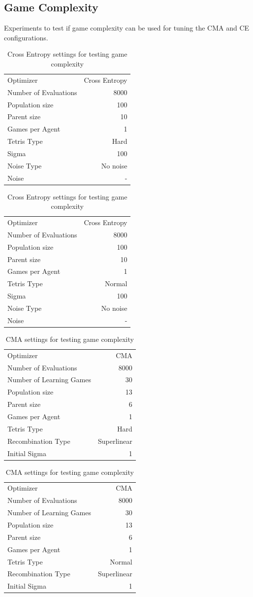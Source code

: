 \subsection{Game Complexity}
Experiments to test if game complexity can be used for tuning the CMA and CE configurations.

\begin{table}[h]
\centering
\begin{tabular}{l r}
Optimizer & Cross Entropy\\
Number of Evaluations & 8000\\
Population size & 100\\
Parent size & 10\\
Games per Agent & 1\\
Tetris Type & Hard\\
\hline
Sigma & 100\\
Noise Type & No noise\\
Noise & -
\end{tabular}
\quad
\begin{tabular}{l r}
Optimizer & Cross Entropy\\
Number of Evaluations & 8000\\
Population size & 100\\
Parent size & 10\\
Games per Agent & 1\\
Tetris Type & Normal\\
\hline
Sigma & 100\\
Noise Type & No noise\\
Noise & -
\end{tabular}
\caption{Cross Entropy settings for testing game complexity}
\end{table}

\begin{table}[h]
\centering
\begin{tabular}{l r}
Optimizer & CMA\\
Number of Evaluations & 8000\\
Number of Learning Games & 30\\
Population size& 13\\
Parent size & 6\\
Games per Agent & 1\\
Tetris Type & Hard\\
\hline
Recombination Type & Superlinear\\
Initial Sigma & 1
\end{tabular}
\quad
\begin{tabular}{l r}
Optimizer & CMA\\
Number of Evaluations & 8000\\
Number of Learning Games & 30\\
Population size& 13\\
Parent size & 6\\
Games per Agent & 1\\
Tetris Type & Normal\\
\hline
Recombination Type & Superlinear\\
Initial Sigma & 1
\end{tabular}
\caption{CMA settings for testing game complexity}
\end{table}

